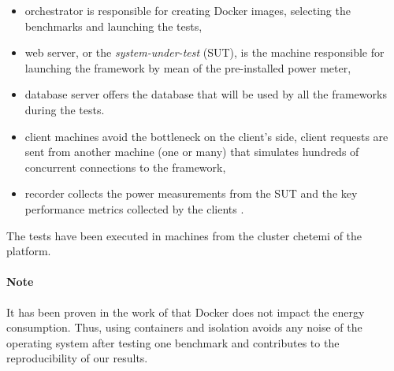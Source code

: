 

\begin{itemize}
    \item \textsf{orchestrator} is responsible for creating Docker images, selecting the benchmarks and launching the tests,
    \item \textsf{web server}, or the \emph{system-under-test} (SUT), is the machine responsible for launching the framework by mean of the pre-installed power meter,
    \item \textsf{database server} offers the database that will be used by all the frameworks during the tests.
    \item \textsf{client machines} avoid the bottleneck on the client's side, client requests are sent from another machine (one or many) that simulates hundreds of concurrent connections to the framework,
    \item \textsf{recorder} collects the power measurements from the SUT and the key performance metrics collected by the clients .
\end{itemize}

The tests have been executed in machines from the cluster \textsf{chetemi} of the  platform.

\paragraph{Note}
It has been proven in the work of \citeauthor{eddie_antonio_santos_how} that Docker does not impact the energy consumption.
Thus, using containers and isolation avoids any noise of the operating system after testing one benchmark and contributes to the reproducibility of our results.


